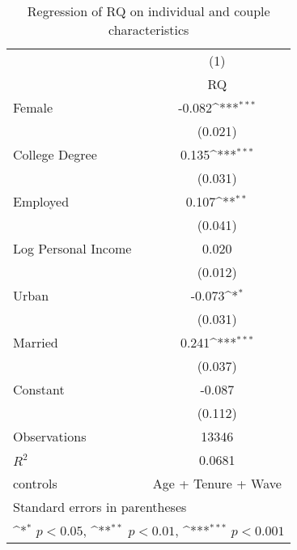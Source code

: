 \begin{table}[htbp]\centering
\def\sym#1{\ifmmode^{#1}\else\(^{#1}\)\fi}
\caption{Regression of RQ on individual and couple characteristics}
\begin{tabular}{l*{1}{c}}
\hline\hline
                    &\multicolumn{1}{c}{(1)}         \\
                    &          RQ         \\
\hline
Female              &      -0.082\sym{***}\\
                    &     (0.021)         \\
[1em]
College Degree      &       0.135\sym{***}\\
                    &     (0.031)         \\
[1em]
Employed            &       0.107\sym{**} \\
                    &     (0.041)         \\
[1em]
Log Personal Income &       0.020         \\
                    &     (0.012)         \\
[1em]
Urban               &      -0.073\sym{*}  \\
                    &     (0.031)         \\
[1em]
Married             &       0.241\sym{***}\\
                    &     (0.037)         \\
[1em]
Constant            &      -0.087         \\
                    &     (0.112)         \\
\hline
Observations        &       13346         \\
\(R^{2}\)           &      0.0681         \\
controls            &Age + Tenure + Wave         \\
\hline\hline
\multicolumn{2}{l}{\footnotesize Standard errors in parentheses}\\
\multicolumn{2}{l}{\footnotesize \sym{*} \(p<0.05\), \sym{**} \(p<0.01\), \sym{***} \(p<0.001\)}\\
\end{tabular}
\end{table}
